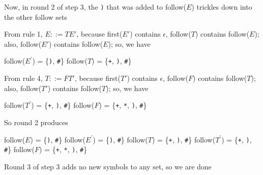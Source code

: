 \documentclass[8pt,a4paper,compress,handout]{beamer}
\newcommand{\mm}[1]{$#1$}
\newcommand{\expo}[2]{$#1^{#2}$}
\newenvironment{spaced}
{
\smallskip
\hspace{.5cm}
\begin{minipage}[c]{\textwidth}
}
{
\end{minipage}
\smallskip
}
\begin{document}
\begin{frame}[fragile]
\pause

Now, in round 2 of step 3, the \lstinline{)} that was added to follow($E$) trickles down into the other follow sets

\pause
\bigskip

From rule 1, $E  ::= T E'$, because first($E'$) contains $\epsilon$, follow($T$) contains follow($E$); also, follow($E'$) contains follow($E$); so, we have

\text{ }
\begin{spaced}
\begin{production}
follow(\expo{E}{\prime}) = \{\lstinline{)}, \lstinline{#}\}
follow(\mm{T})  = \{\lstinline{+}, \lstinline{)},  \lstinline{#}\}
\end{production}
\end{spaced}

\pause

From rule 4, $T  ::= F T'$, because first($T'$) contains $\epsilon$, follow($F$) contains follow($T$); also, follow($T'$) contains follow($T$); so, we have

\text{ }
\begin{spaced}
\begin{production}
follow(\expo{T}{\prime}) = \{\lstinline{+}, \lstinline{)}, \lstinline{#}\}
follow(\mm{F})  = \{\lstinline{+}, \lstinline{*}, \lstinline{)}, \lstinline{#}\}
\end{production}
\end{spaced}

\pause

So round 2 produces

\text{ }
\begin{spaced}
\begin{production}
follow(\mm{E})  = \{\lstinline{)}, \lstinline{#}\}
follow(\expo{E}{\prime}) = \{\lstinline{)}, \lstinline{#}\}
follow(\mm{T})  = \{\lstinline{+}, \lstinline{)},  \lstinline{#}\}
follow(\expo{T}{\prime}) = \{\lstinline{+}, \lstinline{)}, \lstinline{#}\}
follow(\mm{F})  = \{\lstinline{+}, \lstinline{*}, \lstinline{)}, \lstinline{#}\}
\end{production}
\end{spaced}

\pause

Round 3 of step 3 adds no new symbols to any set, so we are done
\end{frame}
\end{document}

